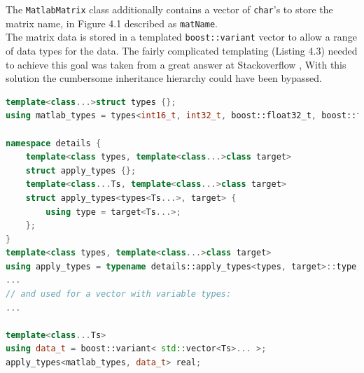 The \texttt{MatlabMatrix} class additionally contains a vector of \texttt{char}'s to store the matrix name, in Figure 4.1 described as \texttt{matName}.\\
The matrix data is stored in a templated \texttt{boost::variant} vector to allow a range of data types for the data. The fairly complicated templating (Listing 4.3) needed to achieve this goal was taken from a great answer at Stackoverflow \cite{stackof}, With this solution the cumbersome inheritance hierarchy could have been bypassed. 
\vspace{1em}
\begin{lstlisting}[language=C++, caption=A code snippet showing the templating to allow various types in a Boost variant.]
template<class...>struct types {};
using matlab_types = types<int16_t, int32_t, boost::float32_t, boost::float64_t, uint8_t, uint16_t>;

namespace details {
    template<class types, template<class...>class target>
    struct apply_types {};
    template<class...Ts, template<class...>class target>
    struct apply_types<types<Ts...>, target> {
        using type = target<Ts...>;
    };
}
template<class types, template<class...>class target>
using apply_types = typename details::apply_types<types, target>::type;
...
// and used for a vector with variable types:
...

template<class...Ts>
using data_t = boost::variant< std::vector<Ts>... >;
apply_types<matlab_types, data_t> real;
\end{lstlisting}

